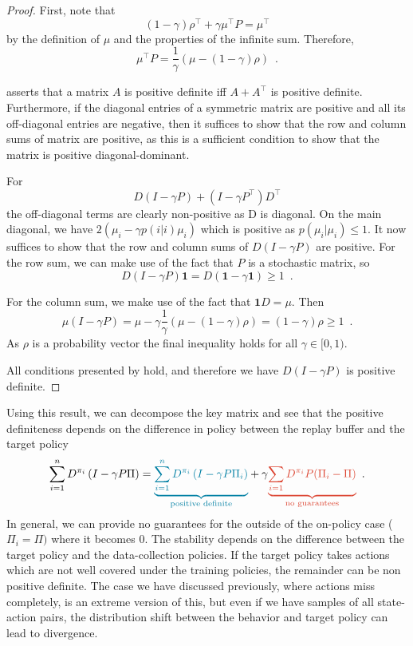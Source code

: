 \begin{proof}
    First, note that $$(1 - \gamma) \rho^\top + \gamma \mu^\top P = \mu^\top$$ by the definition of $\mu$ and the properties of the infinite sum.
    Therefore, $$\mu^\top P = \frac{1}{\gamma}\left(\mu - (1 - \gamma) \rho\right)\enspace.$$

    \textcite{sutton1988learning} asserts that a matrix $A$ is positive definite iff $A + A^\top$ is positive definite.
    Furthermore, if the diagonal entries of a symmetric matrix are positive and all its off-diagonal entries are negative, then it suffices to show that the row and column sums of matrix are positive, as this is a sufficient condition to show that the matrix is positive diagonal-dominant.

    For $$D(I - \gamma P) + (I - \gamma P^\top) D^\top$$ the off-diagonal terms are clearly non-positive as D is diagonal.
    On the main diagonal, we have $2(\mu_i - \gamma p(i|i)\mu_i)$ which is positive as $p(\mu_i|\mu_i) \leq 1$.
    It now suffices to show that the row and column sums of $D(I - \gamma P)$ are positive.
    For the row sum, we can make use of the fact that $P$ is a stochastic matrix, so $$D(I-\gamma P)\mathbf{1} = D(\mathbf{1} - \gamma\mathbf{1}) \geq 1\enspace.$$

    For the column sum, we make use of the fact that $\mathbf{1}D = \mu$.
    Then $$\mu(I - \gamma P) = \mu - \gamma \frac{1}{\gamma}\left(\mu - (1 - \gamma) \rho\right) = (1-\gamma)\rho \geq 1\enspace.$$
    As $\rho$ is a probability vector the final inequality holds for all $\gamma \in [0,1)$.
    
    All conditions presented by \textcite{sutton1988learning} hold, and therefore we have $D(I-\gamma P)$ is positive definite.
\end{proof}

Using this result, we can decompose the key matrix and see that the positive definiteness depends on the difference in policy between the replay buffer and the target policy
\begin{align}
    \sum_{i=1}^n D^{\pi_i} \left(I - \gamma P\Pi \right) = \blue{\underbrace{\sum_{i=1}^n D^{\pi_i} \left(I - \gamma P\Pi_i \right)}_{\text{positive definite}}} + \gamma \red{\underbrace{\sum_{i=1} D^{\pi_i}P (\Pi_i - \Pi)}_{\text{no guarantees}}} \enspace .
\end{align}
In general, we can provide no guarantees for the  outside of the on-policy case ($\Pi_i = \Pi)$ where it becomes $0$.
The stability depends on the difference between the target policy and the data-collection policies.
If the target policy takes actions which are not well covered under the training policies, the remainder can be non positive definite.
The case we have discussed previously, where actions miss completely, is an extreme version of this, but even if we have samples of all state-action pairs, the distribution shift between the behavior and target policy can lead to divergence.

